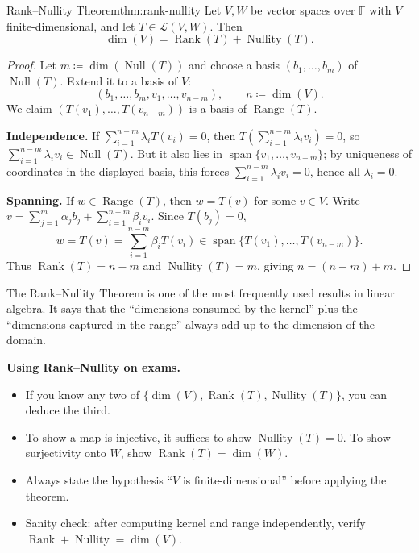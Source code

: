 \begin{theorem}{Rank--Nullity Theorem}{thm:rank-nullity}
Let $V,W$ be vector spaces over $\mathbb{F}$ with $V$ finite-dimensional, and let $T\in\mathcal{L}(V,W)$.
Then
\[
\dim(V)=\operatorname{Rank}(T)+\operatorname{Nullity}(T).
\]
\end{theorem}

\begin{proof}
Let $m\coloneqq \dim(\operatorname{Null}(T))$ and choose a basis $(b_1,\dots,b_m)$ of $\operatorname{Null}(T)$.
Extend it to a basis of $V$:
\[
(b_1,\dots,b_m,v_1,\dots,v_{n-m}),
\qquad n\coloneqq \dim(V).
\]
We claim $(T(v_1),\dots,T(v_{n-m}))$ is a basis of $\operatorname{Range}(T)$.

\textbf{Independence.} If $\sum_{i=1}^{n-m}\lambda_i T(v_i)=0$, then
$T(\sum_{i=1}^{n-m}\lambda_i v_i)=0$, so $\sum_{i=1}^{n-m}\lambda_i v_i\in\operatorname{Null}(T)$.
But it also lies in $\operatorname{span}\{v_1,\dots,v_{n-m}\}$; by uniqueness of coordinates in the displayed basis, this forces
$\sum_{i=1}^{n-m}\lambda_i v_i=0$, hence all $\lambda_i=0$.

\textbf{Spanning.} If $w\in\operatorname{Range}(T)$, then $w=T(v)$ for some $v\in V$.
Write $v=\sum_{j=1}^m\alpha_j b_j+\sum_{i=1}^{n-m}\beta_i v_i$. Since $T(b_j)=0$,
\[
w=T(v)=\sum_{i=1}^{n-m}\beta_i T(v_i)\in \operatorname{span}\{T(v_1),\dots,T(v_{n-m})\}.
\]
Thus $\operatorname{Rank}(T)=n-m$ and $\operatorname{Nullity}(T)=m$, giving $n=(n-m)+m$.

\end{proof}

The Rank--Nullity Theorem is one of the most frequently used results in linear algebra.
It says that the ``dimensions consumed by the kernel'' plus the ``dimensions captured in the range'' always add up to the dimension of the domain.

\begin{examtip}
\textbf{Using Rank--Nullity on exams.}
\begin{itemize}
\item If you know any two of $\{\dim(V),\operatorname{Rank}(T),\operatorname{Nullity}(T)\}$, you can deduce the third.
\item To show a map is injective, it suffices to show $\operatorname{Nullity}(T)=0$. To show surjectivity onto $W$, show $\operatorname{Rank}(T)=\dim(W)$.
\item Always state the hypothesis ``$V$ is finite-dimensional'' before applying the theorem.
\item Sanity check: after computing kernel and range independently, verify $\operatorname{Rank}+\operatorname{Nullity}=\dim(V)$.
\end{itemize}
\end{examtip}

